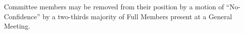  Committee members may be removed from their position by a motion of ``No-Confidence'' by a two-thirds majority of Full Members present at a General Meeting.\ \\